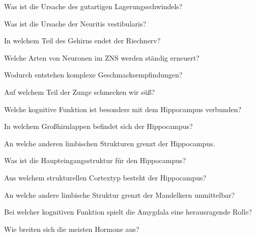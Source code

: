 \documentclass[10pt, a4paper]{exam}
\begin{document}
\begin{questions}
  \begin{solution}
  \end{solution}
  \question Was ist die Ursache des gutartigen Lagerungsschwindels?
  \begin{solution}
  \end{solution}
  \question Was ist die Ursache der Neuritis vestibularis?
  \begin{solution}
  \end{solution}
  \question In welchem Teil des Gehirns endet der Riechnerv?
  \begin{solution}
  \end{solution}
  \question Welche Arten von Neuronen im ZNS werden ständig erneuert?
  \begin{solution}
  \end{solution}
  \question Wodurch entstehen komplexe Geschmacksempfindungen?
  \begin{solution}
  \end{solution}
  \question Auf welchem Teil der Zunge schmecken wir süß?
  \begin{solution}
  \end{solution}
  \question Welche kognitive Funktion ist besonders mit dem Hippocampus verbunden?
  \begin{solution}
  \end{solution}
  \question In welchem Großhirnlappen befindet sich der Hippocampus?
  \begin{solution}
  \end{solution}
  \question An welche anderen limbischen Strukturen grenzt der Hippocampus.
  \begin{solution}
  \end{solution}
  \question Was ist die Haupteingangsstruktur für den Hippocampus?
  \begin{solution}
  \end{solution}
  \question Aus welchem strukturellen Cortextyp besteht der Hippocampus?
  \begin{solution}
  \end{solution}
  \question An welche andere limbische Struktur grenzt der Mandelkern unmittelbar?
  \begin{solution}
  \end{solution}
  \question Bei welcher kognitiven Funktion spielt die Amygdala eine herausragende Rolle?
  \begin{solution}
  \end{solution}
  \question Wie breiten sich die meisten Hormone aus?
  \begin{solution}

\end{solution}
\end{questions}
\end{document}

